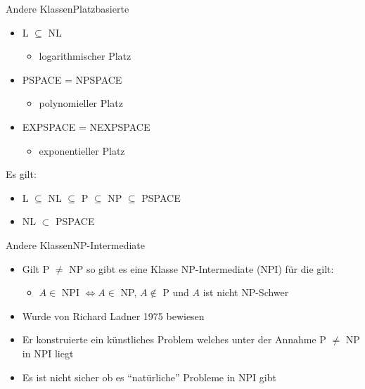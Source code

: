 \documentclass[ignorenonframetext,]{beamer}
\begin{document}
\begin{frame}{Andere Klassen}{Platzbasierte}

\begin{itemize}
\itemsep1pt\parskip0pt
\item
  L $\subseteq$ NL

  \begin{itemize}
  \itemsep1pt\parskip0pt
  \item
    logarithmischer Platz
  \end{itemize}
\item
  PSPACE = NPSPACE

  \begin{itemize}
  \itemsep1pt\parskip0pt
  \item
    polynomieller Platz
  \end{itemize}
\item
  EXPSPACE = NEXPSPACE

  \begin{itemize}
  \itemsep1pt\parskip0pt
  \item
    exponentieller Platz
  \end{itemize}
\end{itemize}

Es gilt:

\begin{itemize}
\itemsep1pt\parskip0pt
\item
  L $\subseteq$ NL $\subseteq$ P $\subseteq$ NP $\subseteq$ PSPACE
\item
  NL $\subset$ PSPACE
\end{itemize}

\end{frame}

\begin{frame}{Andere Klassen}{NP-Intermediate}
\begin{itemize}
\itemsep1pt\parskip0pt
\item
  Gilt P $\neq$ NP so gibt es eine Klasse NP-Intermediate (NPI) für die
  gilt:

  \begin{itemize}
  \itemsep1pt\parskip0pt
  \item
    $A \in$ NPI $\Leftrightarrow A \in$ NP, $A \notin$ P und $A$ ist
    nicht NP-Schwer
  \end{itemize}
\item
  Wurde von Richard Ladner 1975 bewiesen
\item
  Er konstruierte ein künstliches Problem welches unter der Annahme P
  $\neq$ NP in NPI liegt
\item
  Es ist nicht sicher ob es ``natürliche'' Probleme in NPI gibt
\end{itemize}
\end{frame}
\end{document}
